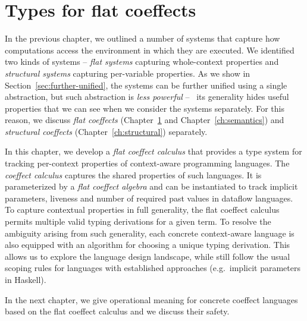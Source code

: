 
\chapter{Types for flat coeffects}
\label{ch:flat}

In the previous chapter, we outlined a number of systems that capture how computations
access the environment in which they are executed. We identified two kinds of systems --
\emph{flat systems} capturing whole-context properties and \emph{structural systems} capturing
per-variable properties. As we show in Section~\ref{sec:further-unified}, the systems can be
further unified using a single abstraction, but such abstraction is \emph{less powerful} -- \ie~its
generality hides useful properties that we can see when we consider the systems separately. For
this reason, we discuss \emph{flat coeffects} (Chapter~\ref{ch:flat} and Chapter~\ref{ch:semantics})
and \emph{structural coeffects} (Chapter~\ref{ch:structural}) separately.

In this chapter, we develop a \emph{flat coeffect calculus} that provides a type system for
tracking per-context properties of context-aware programming languages. The \emph{coeffect
calculus} captures the shared properties of such languages. It is parameterized by a \emph{flat
coeffect algebra} and can be instantiated to track implicit parameters, liveness and number of
required past values in dataflow languages.
To capture contextual properties in full generality, the flat coeffect calculus permits multiple
valid typing derivations for a given term. To resolve the ambiguity arising from such generality,
each concrete context-aware language is also equipped with an algorithm for choosing a unique
typing derivation. This allows us to explore the language design landscape, while still follow
the usual scoping rules for languages with established approaches (e.g.~implicit parameters in
Haskell).

In the next chapter, we give operational meaning for concrete coeffect
languages based on the flat coeffect calculus and we discuss their safety.

